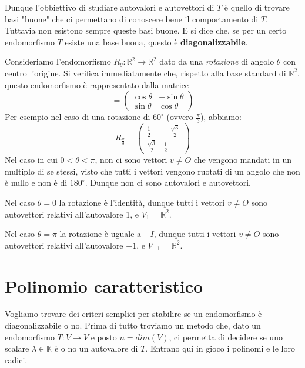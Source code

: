 Dunque l'obbiettivo di studiare autovalori e autovettori di $T$ \`e quello di
trovare basi "buone" che ci permettano di conoscere bene il comportamento di $T$.
Tuttavia non esistono sempre queste basi buone. E si dice che, se per un certo
endomorfismo $T$ esiste una base buona, questo \`e \textbf{diagonalizzabile}.

\begin{example}
	Consideriamo l'endomorfismo $R_{\theta} : \mathbb{R}^2 \to \mathbb{R}^2$ dato
	da una \emph{rotazione} di angolo $\theta$ con centro l'origine. Si verifica
	immediatamente che, rispetto alla base standard di $\mathbb{R}^2$, questo
	endomorfismo \`e rappresentato dalla matrice
	\begin{equation*}
		[R_\theta] = \begin{pmatrix}
			\cos{\theta} & -\sin{\theta} \\
			\sin{\theta} & \cos{\theta}
		\end{pmatrix}
	\end{equation*}
	Per esempio nel caso di una rotazione di $60^\circ$ (ovvero $\frac{\pi}{3}$),
	abbiamo:
	\begin{equation*}
		R_{\frac{\pi}{3}} = \begin{pmatrix}
			\frac{1}{2}        & -\frac{\sqrt{3}}{2} \\
			\frac{\sqrt{3}}{2} & \frac{1}{2}
		\end{pmatrix}
	\end{equation*}
	Nel caso in cui $0 < \theta < \pi$, non ci sono vettori $v \neq O$ che vengono
	mandati in un multiplo di se stessi, visto che tutti i vettori vengono ruotati
	di un angolo che non \`e nullo e non \`e di $180^\circ$. Dunque non ci sono
	autovalori e autovettori.

	Nel caso $\theta = 0$ la rotazione \`e l'identit\`a, dunque tutti i vettori
	$v \neq O$ sono autovettori relativi all'autovalore 1, e $V_1 = \mathbb{R}^2$.

	Nel caso $\theta = \pi$ la rotazione \`e uguale a $-I$, dunque tutti i vettori
	$v \neq O$ sono autovettori relativi all'autovalore $-1$, e
	$V_{-1} = \mathbb{R}^2$.
\end{example}

\section{Polinomio caratteristico}
Vogliamo trovare dei criteri semplici per stabilire se un endomorfismo
\`e diagonalizzabile o no. Prima di tutto troviamo un metodo che, dato un
endomorfismo $T : V \to V$ e posto $n = dim(V)$, ci permetta di decidere se
uno scalare $\lambda \in \mathbb{K}$ \`e o no un autovalore di $T$. Entrano
qui in gioco i polinomi e le loro radici.

